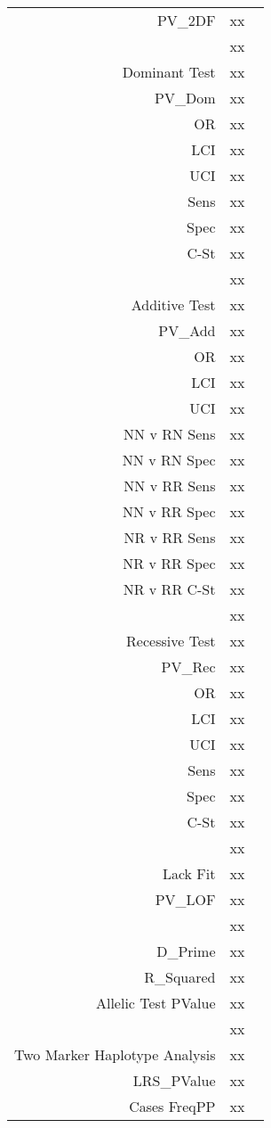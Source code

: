 \begin{supertabular}{r p{5in}}
    PV\_2DF  & xx  \\
  ~ & xx ~ \\
  Dominant Test & xx ~ \\
    PV\_Dom  & xx  \\
    OR  & xx  \\
    LCI  & xx  \\
    UCI  & xx  \\
    Sens  & xx  \\
    Spec  & xx  \\
   C-St  & xx  \\
  ~ & xx ~ \\
  Additive Test & xx ~ \\
    PV\_Add  & xx  \\
    OR  & xx  \\
    LCI  & xx  \\
    UCI  & xx  \\
    NN v RN Sens  & xx  \\
    NN v RN Spec  & xx  \\
    NN v RR Sens  & xx  \\
    NN v RR Spec  & xx  \\
    NR v RR Sens  & xx  \\
    NR v RR Spec  & xx  \\
    NR v RR C-St  & xx  \\
  ~ & xx ~ \\
  Recessive Test & xx ~ \\
    PV\_Rec  & xx  \\
    OR  & xx  \\
    LCI  & xx  \\
    UCI  & xx  \\
    Sens  & xx  \\
    Spec  & xx  \\
    C-St  & xx  \\
  ~ & xx ~ \\
  Lack Fit & xx ~ \\
    PV\_LOF  & xx  \\
  ~ & xx ~ \\
    D\_Prime  & xx  \\
    R\_Squared  & xx  \\
    Allelic Test PValue  & xx  \\
  ~ & xx ~ \\
  Two Marker Haplotype Analysis & xx ~ \\
    LRS\_PValue  & xx  \\
    Cases FreqPP  & xx  \\

\end{supertabular}
